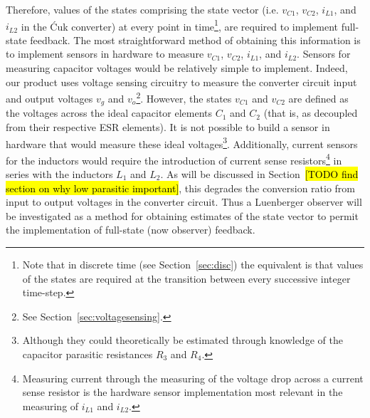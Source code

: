 \newpar
Therefore, values of the states comprising the state vector (i.e. $v_{C1}$, $v_{C2}$, $i_{L1}$, and $i_{L2}$ in the \'Cuk converter) at every point in time\footnote{Note that in discrete time (see Section~\ref{sec:disc}) the equivalent is that values of the states are required at the transition between every successive integer time-step.}, are required to implement full-state feedback. The most straightforward method of obtaining this information is to implement sensors in hardware to measure $v_{C1}$, $v_{C2}$, $i_{L1}$, and $i_{L2}$.
\newpar
Sensors for measuring capacitor voltages would be relatively simple to implement. Indeed, our product uses voltage sensing circuitry to measure the converter circuit input and output voltages $v_g$ and $v_o$\footnote{See Section~\ref{sec:voltagesensing}.}. However, the states $v_{C1}$ and $v_{C2}$ are defined as the voltages across the ideal capacitor elements $C_1$ and $C_2$ (that is, as decoupled from their respective ESR elements). It is not possible to build a sensor in hardware that would measure these ideal voltages\footnote{Although they could theoretically be estimated through knowledge of the capacitor parasitic resistances $R_3$ and $R_4$.}. Additionally, current sensors for the inductors would require the introduction of current sense resistors\footnote{Measuring current through the measuring of the voltage drop across a current sense resistor is the hardware sensor implementation most relevant in the measuring of $i_{L1}$ and $i_{L2}$.} in series with the inductors $L_1$ and $L_2$. As will be discussed in Section~\hl{[TODO find section on why low parasitic important]}, this degrades the conversion ratio from input to output voltages in the converter circuit.
\newpar
Thus a Luenberger observer will be investigated as a method for obtaining estimates of the state vector to permit the implementation of full-state (now observer) feedback.
